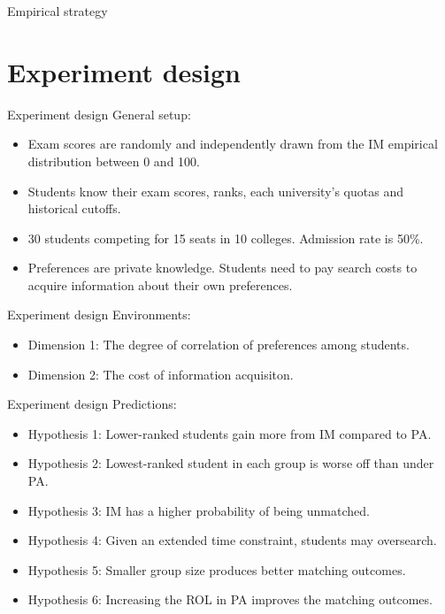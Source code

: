 \documentclass[dvipsnames,mathserif]{beamer}
\begin{document}
{\begin{frame}{Empirical strategy}
\begin{itemize}
    \end{itemize}
\end{frame}

\section{Experiment design}
\begin{frame}{Experiment design}
General setup:
\vspace{0.5cm}
    \begin{itemize}
        \item Exam scores are randomly and independently drawn from the IM empirical distribution between 0 and 100.
        \item Students know their exam scores, ranks, each university's quotas and historical cutoffs. 
        \item 30 students competing for 15 seats in 10 colleges. Admission rate is 50\%.
        \item Preferences are private knowledge. Students need to pay search costs to acquire information about their own preferences.\\
    \end{itemize}

\end{frame}

\begin{frame}{Experiment design}
Environments:
\vspace{0.5cm}
    \begin{itemize}
        \item Dimension 1: The degree of correlation of preferences among students.\\
        \item Dimension 2: The cost of information acquisiton.
    \end{itemize}
\end{frame}

\begin{frame}{Experiment design}
Predictions:
\vspace{0.5cm}
    \begin{itemize}
        \item Hypothesis 1: Lower-ranked students gain more from IM compared to PA.\\
        \item Hypothesis 2: Lowest-ranked student in each group is worse off than under PA.\\ 
        \item Hypothesis 3: IM has a higher probability of being unmatched.\\
        \item Hypothesis 4: Given an extended time constraint, students may oversearch.\\
        \item Hypothesis 5: Smaller group size produces better matching outcomes.\\
        \item Hypothesis 6: Increasing the ROL in PA improves the matching outcomes.
    \end{itemize}
\end{frame}

}
\end{document}
